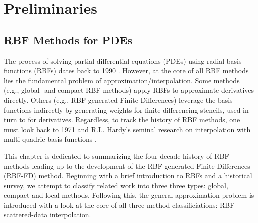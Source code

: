 \documentclass{report}
\begin{document}
\fi

{ \graphicspath{{rbffd_methods_content/}} 


\part{Preliminaries}

\chapter{RBF Methods for PDEs}

The process of solving partial differential equations (PDEs) using radial basis functions (RBFs) dates back to 1990 \cite{Kansa1990a,Kansa1990b}. However, at the core of all RBF methods lies the fundamental problem of approximation/interpolation. Some methods (e.g., global- and compact-RBF methods) apply RBFs to approximate derivatives directly. Others (e.g., RBF-generated Finite Differences) leverage the basis functions indirectly by generating weights for finite-differencing stencils, used in turn to for derivatives. Regardless, to track the history of RBF methods, one must look back to 1971 and R.L. Hardy's seminal research on interpolation with multi-quadric basis functions \cite{Hardy1971}. 

This chapter is dedicated to summarizing the four-decade history of RBF methods leading up to the development of the 
RBF-generated Finite Differences (RBF-FD) method. Beginning with a brief introduction to RBFs and a historical survey, we attempt to classify related work into three three types: global, compact and local methods. Following this, the general approximation problem is introduced with a look at the core of all three method classificiations: RBF scattered-data interpolation. %

}
\end{document}
